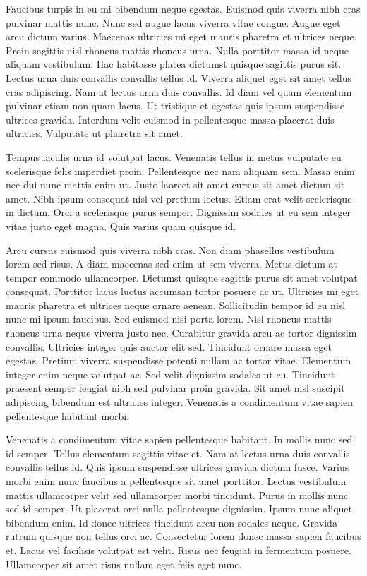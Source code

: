\documentclass[11pt,a4paper]{article}
\begin{document}
Faucibus turpis in eu mi bibendum neque egestas. Euismod quis viverra nibh cras pulvinar mattis nunc. Nunc sed augue lacus viverra vitae congue. Augue eget arcu dictum varius. Maecenas ultricies mi eget mauris pharetra et ultrices neque. Proin sagittis nisl rhoncus mattis rhoncus urna. Nulla porttitor massa id neque aliquam vestibulum. Hac habitasse platea dictumst quisque sagittis purus sit. Lectus urna duis convallis convallis tellus id. Viverra aliquet eget sit amet tellus cras adipiscing. Nam at lectus urna duis convallis. Id diam vel quam elementum pulvinar etiam non quam lacus. Ut tristique et egestas quis ipsum suspendisse ultrices gravida. Interdum velit euismod in pellentesque massa placerat duis ultricies. Vulputate ut pharetra sit amet.

Tempus iaculis urna id volutpat lacus. Venenatis tellus in metus vulputate eu scelerisque felis imperdiet proin. Pellentesque nec nam aliquam sem. Massa enim nec dui nunc mattis enim ut. Justo laoreet sit amet cursus sit amet dictum sit amet. Nibh ipsum consequat nisl vel pretium lectus. Etiam erat velit scelerisque in dictum. Orci a scelerisque purus semper. Dignissim sodales ut eu sem integer vitae justo eget magna. Quis varius quam quisque id.

Arcu cursus euismod quis viverra nibh cras. Non diam phasellus vestibulum lorem sed risus. A diam maecenas sed enim ut sem viverra. Metus dictum at tempor commodo ullamcorper. Dictumst quisque sagittis purus sit amet volutpat consequat. Porttitor lacus luctus accumsan tortor posuere ac ut. Ultricies mi eget mauris pharetra et ultrices neque ornare aenean. Sollicitudin tempor id eu nisl nunc mi ipsum faucibus. Sed euismod nisi porta lorem. Nisl rhoncus mattis rhoncus urna neque viverra justo nec. Curabitur gravida arcu ac tortor dignissim convallis. Ultricies integer quis auctor elit sed. Tincidunt ornare massa eget egestas. Pretium viverra suspendisse potenti nullam ac tortor vitae. Elementum integer enim neque volutpat ac. Sed velit dignissim sodales ut eu. Tincidunt praesent semper feugiat nibh sed pulvinar proin gravida. Sit amet nisl suscipit adipiscing bibendum est ultricies integer. Venenatis a condimentum vitae sapien pellentesque habitant morbi.

Venenatis a condimentum vitae sapien pellentesque habitant. In mollis nunc sed id semper. Tellus elementum sagittis vitae et. Nam at lectus urna duis convallis convallis tellus id. Quis ipsum suspendisse ultrices gravida dictum fusce. Varius morbi enim nunc faucibus a pellentesque sit amet porttitor. Lectus vestibulum mattis ullamcorper velit sed ullamcorper morbi tincidunt. Purus in mollis nunc sed id semper. Ut placerat orci nulla pellentesque dignissim. Ipsum nunc aliquet bibendum enim. Id donec ultrices tincidunt arcu non sodales neque. Gravida rutrum quisque non tellus orci ac. Consectetur lorem donec massa sapien faucibus et. Lacus vel facilisis volutpat est velit. Risus nec feugiat in fermentum posuere. Ullamcorper sit amet risus nullam eget felis eget nunc.
\end{document}
